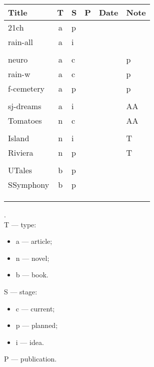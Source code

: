 \documentclass[a4paper,12pt]{article} %
\begin{document}
	
\begin{tabularx}{\textwidth}{|l|c|l|l|c|X|}
	\hline
	Title & T & S & P & Date & Note \\
	\hline
	21ch & a & p &  &  &  \\
	\hline
	rain-all & a & i &  &  &  \\
	\hline
	&  &  &  &  &  \\
	\hline
	neuro & a & c &  &  & p \\
	\hline
	rain-w & a & c &  &  & p \\
	\hline
	f-cemetery & a & p &  &  & p \\
	\hline
	&  &  &  &  &  \\
	\hline
	sj-dreams & a & i &  &  & AA \\
	\hline
	Tomatoes & n & c &  &  & AA \\
	\hline
	&  &  &  &  &  \\
	\hline
	Island & n & i &  &  & T \\
	\hline
	Riviera & n & p &  &  & T \\
	\hline
	&  &  &  &  &  \\
	\hline
	UTales & b & p &  &  &  \\
	\hline
	SSymphony & b & p &  &  &  \\
	\hline
	&  &  &  &  &  \\
	\hline
	&  &  &  &  &  \\
	\hline
	&  &  &  &  &  \\
	\hline
\end{tabularx}

.\\

T --- type:
\begin{itemize}
	\item a --- article;
	\item n --- novel;
	\item b --- book.\\
\end{itemize}

S --- stage:
\begin{itemize}
	\item c --- current;
	\item p --- planned;
	\item i --- idea.\\
\end{itemize}

P --- publication.

\end{document}
